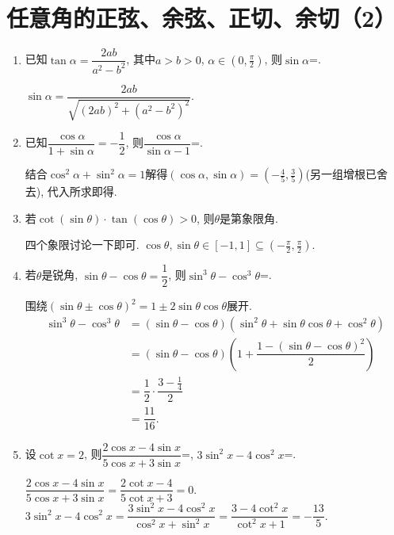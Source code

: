 \section{任意角的正弦、余弦、正切、余切（2）}


\begin{enumerate}
\item 已知$\tan\alpha=\dfrac{2ab}{a^2-b^2}$, 其中$a>b>0$, $\alpha\in(0,\frac{\pi}{2})$, 则$\sin\alpha$=.
\begin{jieda}
$\sin\alpha=\dfrac{2ab}{\sqrt{(2ab)^2+(a^2-b^2)^2}}$. 
\end{jieda}


\item 已知$\dfrac{\cos\alpha}{1+\sin\alpha}=-\dfrac{1}{2}$, 则$\dfrac{\cos\alpha}{\sin\alpha-1}$=. 
\begin{jieda}
结合$\cos^2\alpha+\sin^2\alpha=1$解得$(\cos\alpha,\sin\alpha)=(-\frac{4}{5},\frac{3}{5})$(另一组增根已舍去), 
代入所求即得. 
\end{jieda}



\item 若$\cot(\sin\theta)\cdot\tan(\cos\theta)>0$, 则$\theta$是第象限角. 
\begin{jieda}
四个象限讨论一下即可. $\cos\theta,\sin\theta\in[-1,1]\subseteq(-\frac{\pi}{2},\frac{\pi}{2})$. 
\end{jieda}



\item 若$\theta$是锐角, $\sin\theta-\cos\theta=\dfrac{1}{2}$, 则$\sin^3\theta-\cos^3\theta$=. 
\begin{jieda}
围绕$(\sin\theta\pm\cos\theta)^2=1\pm2\sin\theta\cos\theta$展开. 
\begin{align*}
\sin^3\theta-\cos^3\theta & =(\sin\theta-\cos\theta)(\sin^2\theta+\sin\theta\cos\theta+\cos^2\theta)\\
& = (\sin\theta-\cos\theta)\left(1+\dfrac{1-(\sin\theta-\cos\theta)^2}{2}\right)\\
& = \dfrac{1}{2}\cdot\dfrac{3-\frac{1}{4}}{2}\\
& = \dfrac{11}{16}.
\end{align*}
\end{jieda}



\item 设$\cot{x}=2$, 则$\dfrac{2\cos{x}-4\sin{x}}{5\cos{x}+3\sin{x}}$=, 
$3\sin^2x-4\cos^2x$=. 
\begin{jieda}
$\dfrac{2\cos{x}-4\sin{x}}{5\cos{x}+3\sin{x}}=\dfrac{2\cot{x}-4}{5\cot{x}+3}=0$. \\
$3\sin^2x-4\cos^2x=\dfrac{3\sin^2x-4\cos^2x}{\cos^2x+\sin^2x}=\dfrac{3-4\cot^2x}{\cot^2x+1}=-\dfrac{13}{5}$. 
\end{jieda}


\end{enumerate}
